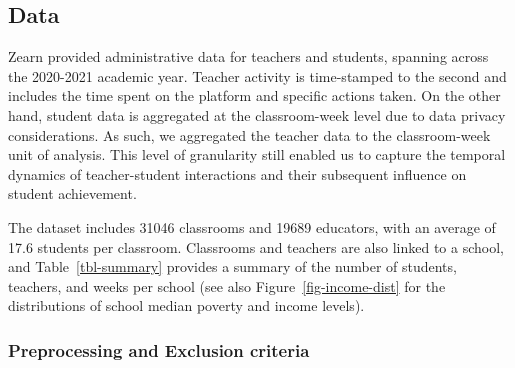 \documentclass[
  number,
  preprint,
  3p,
  onecolumn]{elsarticle}
\begin{document}
\subsection{Data}\label{data}

Zearn provided administrative data for teachers and students, spanning
across the 2020-2021 academic year. Teacher activity is time-stamped to
the second and includes the time spent on the platform and specific
actions taken. On the other hand, student data is aggregated at the
classroom-week level due to data privacy considerations. As such, we
aggregated the teacher data to the classroom-week unit of analysis. This
level of granularity still enabled us to capture the temporal dynamics
of teacher-student interactions and their subsequent influence on
student achievement.

\begin{table}

\caption{\label{tbl-summary}Summary statistics by school. The table
presents the mean, median, standard deviation (SD), minimum, and maximum
values for the number of teachers, total students, and average weeks of
active engagement (across all classrooms within a school).}


\end{table}%

The dataset includes 31046 classrooms and 19689 educators, with an
average of 17.6 students per classroom. Classrooms and teachers are also
linked to a school, and Table~\ref{tbl-summary} provides a summary of
the number of students, teachers, and weeks per school (see also
Figure~\ref{fig-income-dist} for the distributions of school median
poverty and income levels).

\subsubsection{Preprocessing and Exclusion
criteria}\label{preprocessing-and-exclusion-criteria}
\end{document}
